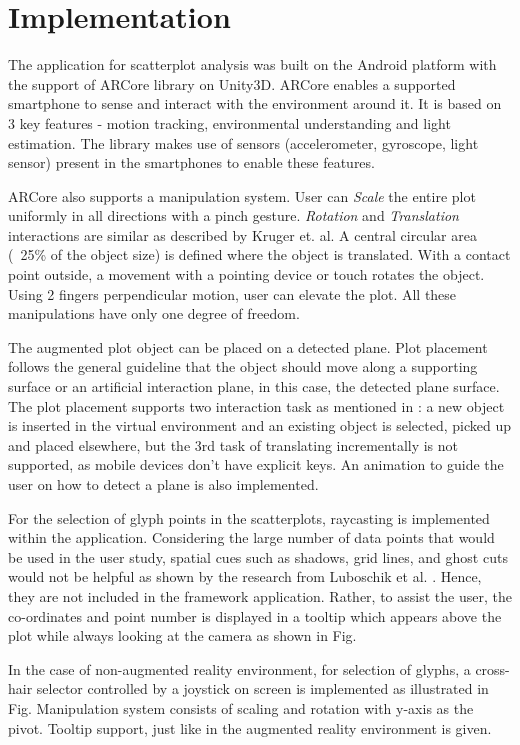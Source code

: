 \documentclass[journal]{vgtc}                %
\begin{document}
\section{Implementation}

The application for scatterplot analysis was built on the Android platform with the support of ARCore library on Unity3D. ARCore enables a supported smartphone to sense and interact with the environment around it. It is based on 3 key features - motion tracking, environmental understanding and light estimation. The library makes use of sensors (accelerometer, gyroscope, light sensor) present in the smartphones to enable these features.

ARCore also supports a manipulation system. User can  \textit{Scale} the entire plot uniformly in all directions with a pinch gesture. \textit{Rotation} and \textit{Translation} interactions are similar as described by Kruger et. al\cite{Kruger2005}. A central circular area (~25\% of the object size) is defined where the object is translated. With a contact point outside, a movement with a pointing device or touch rotates the object. Using 2 fingers perpendicular motion, user can elevate the plot. All these manipulations have only one degree of freedom.

The augmented plot object can be placed on a detected plane. Plot placement follows the general guideline that the object should move along a supporting surface or an artificial interaction plane, in this case, the detected plane surface. The plot placement supports two interaction task as mentioned in \cite{Teather2007}: a new object is inserted in the virtual environment and an existing object is selected, picked up and placed elsewhere, but the 3rd task of translating incrementally is not supported, as mobile devices don’t have explicit keys. An animation to guide the user on how to detect a plane is also implemented.

For the selection of glyph points in the scatterplots, raycasting is implemented within the application. Considering the large number of data points that would be used in the user study, spatial cues such as shadows, grid lines, and ghost cuts would not be helpful as shown by the research from Luboschik et al. \cite{luboschik2016spatial}. Hence, they are not included in the framework application. Rather, to assist the user, the co-ordinates and point number is displayed in a tooltip which appears above the plot while always looking at the camera as shown in Fig.

In the case of non-augmented reality environment, for selection of glyphs, a cross-hair selector controlled by a joystick on screen is implemented as illustrated in Fig. Manipulation system consists of scaling and rotation with y-axis as the pivot. Tooltip support, just like in the augmented reality environment is given.  
\end{document}
